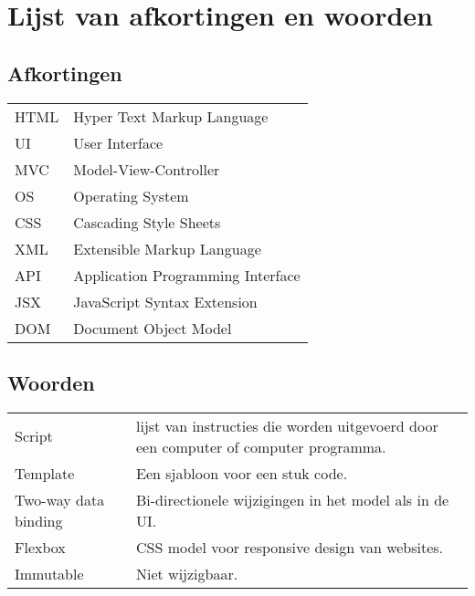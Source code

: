 \chapter*{Lijst van afkortingen en woorden}\label{ch:woorden}
\section*{Afkortingen}
\begin{flushleft}
	\renewcommand{\arraystretch}{1.1}
	\begin{tabularx}{\textwidth}{@{}p{20mm}X@{}}
		HTML\label{html} &  Hyper Text Markup Language\\
		UI\label{ui} & User Interface\\
		MVC\label{mvc} & Model-View-Controller\\
		OS\label{os} & Operating System \\
		CSS\label{css} & Cascading Style Sheets\\
		XML\label{xml} & Extensible Markup Language\\
		API\label{api} & Application Programming Interface\\
		JSX\label{jsx} & JavaScript Syntax Extension\\
		DOM\label{dom} & Document Object Model
	\end{tabularx}
\end{flushleft}

\section*{Woorden}
\begin{flushleft}
	\renewcommand{\arraystretch}{1.1}
	\begin{tabularx}{\textwidth}{@{}p{20mm}X@{}}
		Script\label{script} & lijst van instructies die worden uitgevoerd door een computer of computer programma.\\
		Template\label{template} & Een sjabloon voor een stuk code.\\
		Two-way data binding\label{twdb} & Bi-directionele wijzigingen in het model als in de UI.\\
Flexbox\label{flexbox} & CSS model voor responsive design van websites.\\
Immutable\label{immutable} & Niet wijzigbaar.\\

	\end{tabularx}
\end{flushleft}